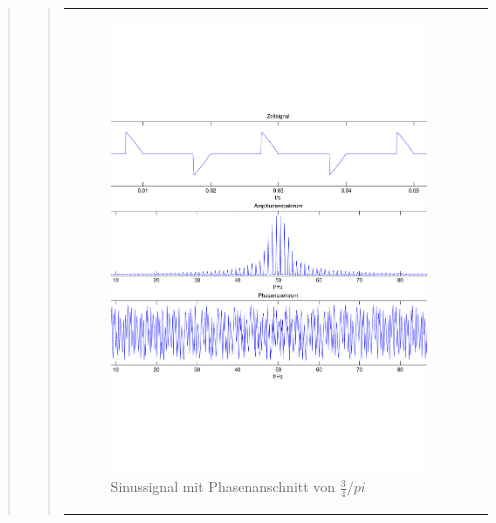 \begin{quote}
\begin{quote}
\begin{center}
\begin{tabular}{ll}
            \hspace{-4em}
                \begin{minipage}{0.6\textwidth}

                    \begin{figure}[H]
                        \label{fig:}
                        \includegraphics[scale=0.3]{./Bilder/Phasenanschnitt68pi.pdf} %
                        \caption{Sinussignal mit Phasenanschnitt von $\frac{3}{4}/pi$}
                    \end{figure}

                \end{minipage}
                \begin{minipage}{0.6\textwidth}


\end{minipage}
\end{tabular}
\end{center}
\end{quote}
\end{quote}
